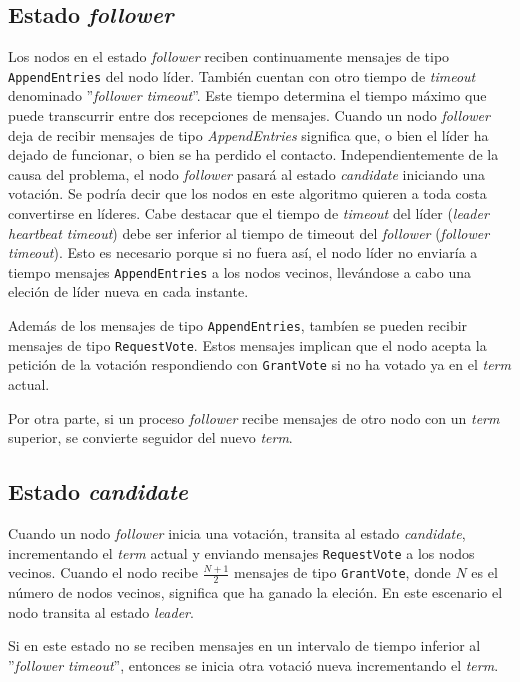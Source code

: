 \subsection*{Estado \textit{follower}}

Los nodos en el estado \textit{follower} reciben continuamente mensajes de tipo \texttt{AppendEntries} del nodo líder. También cuentan con otro tiempo de \textit{timeout} denominado ''\textit{follower timeout}''. Este tiempo determina el tiempo máximo que puede transcurrir entre dos recepciones de mensajes. Cuando un nodo \textit{follower} deja de recibir mensajes de tipo \textit{AppendEntries} significa que, o bien el líder ha dejado de funcionar, o bien se ha perdido el contacto. Independientemente de la causa del problema, el nodo \textit{follower} pasará al estado \textit{candidate} iniciando una votación. Se podría decir que los nodos en este algoritmo quieren a toda costa convertirse en líderes. Cabe destacar que el tiempo de \textit{timeout} del líder (\textit{leader heartbeat timeout}) debe ser inferior al tiempo de timeout del \textit{follower} (\textit{follower timeout}). Esto es necesario porque si no fuera así, el nodo líder no enviaría a tiempo mensajes \texttt{AppendEntries} a los nodos vecinos, llevándose a cabo una eleción de líder nueva en cada instante.

Además de los mensajes de tipo \texttt{AppendEntries}, tambíen se pueden recibir mensajes de tipo \texttt{RequestVote}. Estos mensajes implican que el nodo acepta la petición de la votación respondiendo con \texttt{GrantVote} si no ha votado ya en el \textit{term} actual.

Por otra parte, si un proceso \textit{follower} recibe mensajes de otro nodo con un \textit{term} superior, se convierte seguidor del nuevo \textit{term}.

\subsection*{Estado \textit{candidate}}

Cuando un nodo \textit{follower} inicia una votación, transita al estado \textit{candidate}, incrementando el \textit{term} actual y enviando mensajes \texttt{RequestVote} a los nodos vecinos. Cuando el nodo recibe $\frac{N + 1}{2}$ mensajes de tipo \texttt{GrantVote}, donde $N$ es el número de nodos vecinos, significa que ha ganado la eleción. En este escenario el nodo transita al estado \textit{leader}.

Si en este estado no se reciben mensajes en un intervalo de tiempo inferior al ''\textit{follower timeout}'', entonces se inicia otra votació nueva incrementando el \textit{term}.

